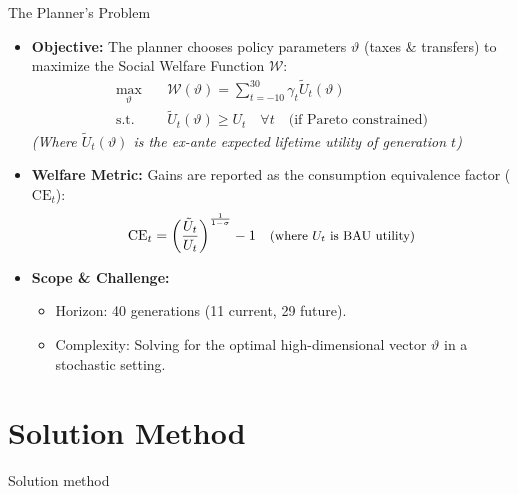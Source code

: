 \documentclass[aspectratio=1610]{beamer}
\begin{document}
\begin{frame}[fragile]{The Planner's Problem}

\begin{itemize}
    \setlength\itemsep{1em} 

    \item \textbf{Objective:} The planner chooses policy parameters $\vartheta$ (taxes \& transfers) to maximize the Social Welfare Function $\mathcal{W}$:
    \begin{align}
       \max_{\vartheta} \quad & \mathcal{W}(\vartheta) = \sum_{t = -10}^{30} \gamma_t \tilde{U}_t(\vartheta) \\
       \text{s.t.} \quad & \tilde{U}_t(\vartheta) \ge U_t \quad \forall t \quad \text{(if Pareto constrained)} \nonumber
    \end{align}
    \vspace{-0.5em}
    {\footnotesize \emph{(Where $\tilde{U}_t(\vartheta)$ is the ex-ante expected lifetime utility of generation $t$)}}
    
    \item \textbf{Welfare Metric:} Gains are reported as the consumption equivalence factor ($\text{CE}_t$):
    \[
       \text{CE}_t = \left(\frac{\tilde{U}_t}{U_t}\right)^{\frac{1}{1-\sigma}}-1 \quad \text{\small{(where $U_t$ is BAU utility)}}
    \]

    \item \textbf{Scope \& Challenge:} 
    \begin{itemize}
        \item Horizon: 40 generations (11 current, 29 future).
        \item Complexity: Solving for the optimal high-dimensional vector $\vartheta$ in a stochastic setting.
    \end{itemize}

\end{itemize}

\end{frame}

\section[Solution method]{Solution Method}
{
\begin{frame}
\Huge \textcolor{uzhblue}{Solution method}
\end{frame}}
\end{document}
